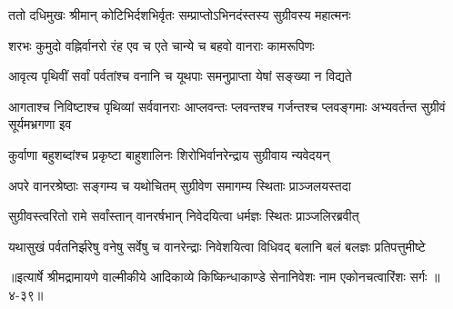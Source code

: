 \twolineshloka
{ततो दधिमुखः श्रीमान् कोटिभिर्दशभिर्वृतः}
{सम्प्राप्तोऽभिनदंस्तस्य सुग्रीवस्य महात्मनः} %

\twolineshloka
{शरभः कुमुदो वह्निर्वानरो रंह एव च}
{एते चान्ये च बहवो वानराः कामरूपिणः} %

\twolineshloka
{आवृत्य पृथिवीं सर्वां पर्वतांश्च वनानि च}
{यूथपाः समनुप्राप्ता येषां सङ्ख्या न विद्यते} %

\threelineshloka
{आगताश्च निविष्टाश्च पृथिव्यां सर्ववानराः}
{आप्लवन्तः प्लवन्तश्च गर्जन्तश्च प्लवङ्गमाः}
{अभ्यवर्तन्त सुग्रीवं सूर्यमभ्रगणा इव} %

\twolineshloka
{कुर्वाणा बहुशब्दांश्च प्रकृष्टा बाहुशालिनः}
{शिरोभिर्वानरेन्द्राय सुग्रीवाय न्यवेदयन्} %

\twolineshloka
{अपरे वानरश्रेष्ठाः सङ्गम्य च यथोचितम्}
{सुग्रीवेण समागम्य स्थिताः प्राञ्जलयस्तदा} %

\twolineshloka
{सुग्रीवस्त्वरितो रामे सर्वांस्तान् वानरर्षभान्}
{निवेदयित्वा धर्मज्ञः स्थितः प्राञ्जलिरब्रवीत्} %

\twolineshloka
{यथासुखं पर्वतनिर्झरेषु वनेषु सर्वेषु च वानरेन्द्राः}
{निवेशयित्वा विधिवद् बलानि बलं बलज्ञः प्रतिपत्तुमीष्टे} %


॥इत्यार्षे श्रीमद्रामायणे वाल्मीकीये आदिकाव्ये किष्किन्धाकाण्डे सेनानिवेशः नाम एकोनचत्वारिंशः सर्गः ॥४-३९॥
